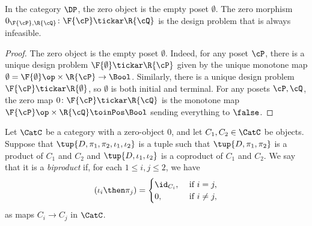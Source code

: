 \begin{lemma}
In the category $\DP$, the zero object is the empty poset $\emptyset$. The zero morphism $0_{\F{\cP},\R{\cQ}}\colon \F{\cP} \tickar \R{\cQ}$ is the design problem that is always infeasible.
\end{lemma}
\begin{proof}
    The zero object is the empty poset $\emptyset$. Indeed, for any poset $\cP $, there is a unique design problem $\F{\emptyset} \tickar \R{\cP} $ given by the unique monotone map $\emptyset=\F{\emptyset}\op\times \R{\cP} \to\Bool$. Similarly, there is a unique design problem $\F{\cP} \tickar \R{\emptyset}$, so $\emptyset$ is both initial and terminal. For any posets $\cP ,\cQ $, the zero map $0 \colon \F{\cP} \tickar \R{\cQ}$ is the monotone map $\F{\cP} \op\times \R{\cQ} \toinPos \Bool$ sending everything to $\false$.
\end{proof}

\begin{shaded}
\begin{definition}[Biproduct]
Let $\CatC$ be a category with a zero-object $0$, and let $C_1,C_2\in\CatC$ be objects. Suppose that $\tup{D,\pi_1,\pi_2,\iota_1,\iota_2}$ is a tuple such that $\tup{D,\pi_1,\pi_2}$ is a product of $C_1$ and $C_2$ and $\tup{D,\iota_1,\iota_2}$ is a coproduct of $C_1$ and $C_2$. We say that it is a \emph{biproduct} if, for each $1\leq i,j\leq 2$, we have
\begin{equation}
(\iota_i\then \pi_j)=
\begin{cases}
	\id_{C_i}, &\text{ if }i=j,\\
	0, &\text{ if }i\neq j,
\end{cases} \label{eq:biproduct-condition}
\end{equation}
as maps $C_i\to C_j$ in $\CatC$.
\end{definition}
\end{shaded}

